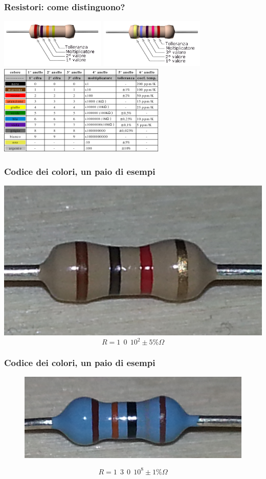 		\begin{frame}[c]\frametitle{Resistori: come distinguono?}
			\includegraphics[width= 5cm]{./img/r5.png}
		    \includegraphics[width= 5cm]{./img/r1.png}\\
		    \centering \includegraphics[width= 8cm]{./img/codice.png}
		\end{frame}
		
		\begin{frame}[c]\frametitle{Codice dei colori, un paio di esempi}
		    \centering
			\includegraphics[width= 5 cm] {./img/E12.jpg}
			\pause
			\[
			R = 1 ~~ 0 ~~ 10^{2} \pm 5\% \Omega
			\]
		\end{frame}

		\begin{frame}[c]\frametitle{Codice dei colori, un paio di esempi}
		    \centering
			\begin{figure}[tb]
				\centering
				\includegraphics[width= 5 cm] {./img/E19.jpg}				
				\label{fig:figure1}
			\end{figure}

			\pause
			
			\[
			R = 1 ~~ 3 ~~ 0 ~~ 10^{8} \pm 1\% \Omega
			\]
		\end{frame}

